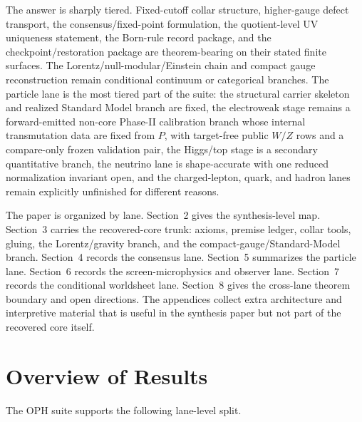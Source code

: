 \documentclass[11pt]{article}
\begin{document}
The answer is sharply tiered. Fixed-cutoff collar structure, higher-gauge defect transport,
the consensus/fixed-point formulation, the quotient-level UV uniqueness statement, the Born-rule
record package, and the checkpoint/restoration package are theorem-bearing on their stated finite
surfaces. The Lorentz/null-modular/Einstein chain and compact gauge reconstruction remain
conditional continuum or categorical branches. The particle lane is the most tiered part of
the suite: the structural carrier skeleton and realized Standard Model branch are fixed, the
electroweak stage remains a forward-emitted non-core Phase-II calibration branch whose internal
transmutation data are fixed from \(P\), with target-free public \(W/Z\) rows and a compare-only
frozen validation pair, the Higgs/top stage is a secondary quantitative branch, the neutrino lane
is shape-accurate with one reduced normalization invariant open, and the charged-lepton, quark,
and hadron lanes remain explicitly unfinished for different reasons.

The paper is organized by lane. Section~2 gives the synthesis-level map. Section~3 carries the
recovered-core trunk: axioms, premise ledger, collar tools, gluing, the Lorentz/gravity branch,
and the compact-gauge/Standard-Model branch. Section~4 records the consensus lane. Section~5
summarizes the particle lane. Section~6 records the screen-microphysics and observer lane.
Section~7 records the conditional worldsheet lane. Section~8 gives the cross-lane theorem
boundary and open directions. The appendices collect extra architecture and interpretive
material that is useful in the synthesis paper but not part of the recovered core itself.

\section{Overview of Results}

The OPH suite supports the following lane-level split.
\end{document}
